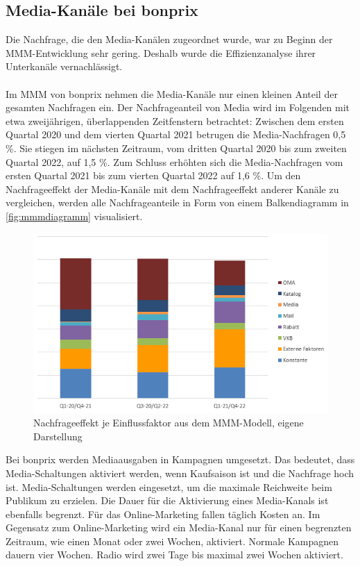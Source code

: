 \subsection{Media-Kanäle bei bonprix} 
\label{MediaKanäleBeiBonprix}
Die Nachfrage, die den Media-Kanälen zugeordnet wurde, war zu Beginn der \ac{MMM}-Entwicklung sehr gering. Deshalb wurde die Effizienzanalyse ihrer Unterkanäle vernachlässigt. \\\\
Im \ac{MMM} von bonprix nehmen die Media-Kanäle nur einen kleinen Anteil der gesamten Nachfragen ein. Der Nachfrageanteil von Media wird im Folgenden mit etwa zweijährigen, überlappenden Zeitfenstern betrachtet: Zwischen dem ersten Quartal 2020 und dem vierten Quartal 2021 betrugen die Media-Nachfragen 0,5 \%. Sie stiegen im nächsten Zeitraum, vom dritten Quartal 2020 bis zum zweiten Quartal 2022, auf 1,5 \%. Zum Schluss erhöhten sich die Media-Nachfragen vom ersten Quartal 2021 bis zum vierten Quartal 2022 auf 1,6 \%. Um den Nachfrageeffekt der Media-Kanäle mit dem Nachfrageeffekt anderer Kanäle zu vergleichen, werden alle Nachfrageanteile in Form von einem Balkendiagramm in \autoref{fig:mmmdiagramm} visualisiert. 
\begin{figure}[H]
    \centering
    \includegraphics[width=0.75\linewidth]{images/mmmdiagramm.png}
    \caption{Nachfrageeffekt je Einflussfaktor aus dem \ac{MMM}-Modell, eigene Darstellung }
    \label{fig:mmmdiagramm}
\end{figure}
\noindent
Bei bonprix werden Mediaausgaben in Kampagnen umgesetzt. Das bedeutet, dass Media-Schaltungen aktiviert werden, wenn Kaufsaison ist und die Nachfrage hoch ist. Media-Schaltungen werden eingesetzt, um die maximale Reichweite beim Publikum zu erzielen. Die Dauer für die Aktivierung eines Media-Kanals ist ebenfalls begrenzt. Für das Online-Marketing fallen täglich Kosten an. Im Gegensatz zum Online-Marketing wird ein Media-Kanal nur für einen begrenzten Zeitraum, wie einen Monat oder zwei Wochen, aktiviert. Normale Kampagnen dauern vier Wochen. Radio wird zwei Tage bis maximal zwei Wochen aktiviert. \\\\

